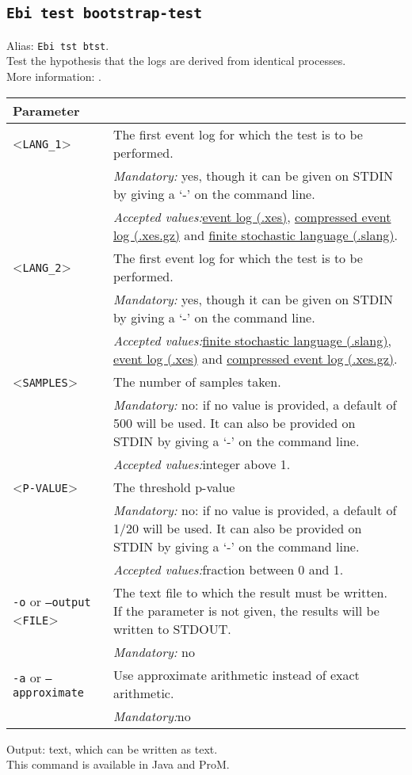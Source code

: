 {\subsection{\texttt{Ebi test bootstrap-test}}
\label{command:Ebi test bootstrap-test}
Alias: \texttt{Ebi tst btst}.\\
Test the hypothesis that the logs are derived from identical processes.\\
More information: \cite{DBLP:journals/tkde/LeemansMPH23}.\\
\begin{tabularx}{\linewidth}{lX}
\toprule
Parameter \\\midrule
<\texttt{LANG\_1}>&The first event log for which the test is to be performed.\\
&\textit{Mandatory:} \quad yes, though it can be given on STDIN by giving a `-' on the command line.\\
&\textit{Accepted values:}\quad \hyperref[filehandler:event log]{event log (.xes)}, \hyperref[filehandler:compressed event log]{compressed event log (.xes.gz)} and \hyperref[filehandler:finite stochastic language]{finite stochastic language (.slang)}.\\
<\texttt{LANG\_2}>&The first event log for which the test is to be performed.\\
&\textit{Mandatory:} \quad yes, though it can be given on STDIN by giving a `-' on the command line.\\
&\textit{Accepted values:}\quad \hyperref[filehandler:finite stochastic language]{finite stochastic language (.slang)}, \hyperref[filehandler:event log]{event log (.xes)} and \hyperref[filehandler:compressed event log]{compressed event log (.xes.gz)}.\\
<\texttt{SAMPLES}>&The number of samples taken.\\
&\textit{Mandatory:} \quad no: if no value is provided, a default of 500 will be used. It can also be provided on STDIN by giving a `-' on the command line.\\
&\textit{Accepted values:}\quad integer above 1.\\
<\texttt{P-VALUE}>&The threshold p-value\\
&\textit{Mandatory:} \quad no: if no value is provided, a default of 1/20 will be used. It can also be provided on STDIN by giving a `-' on the command line.\\
&\textit{Accepted values:}\quad fraction between 0 and 1.\\
\texttt{-o} or \texttt{--output} <\texttt{FILE}> &
The text file to which the result must be written. If the parameter is not given, the results will be written to STDOUT.\\
&\textit{Mandatory:} \quad no\\
\texttt{-a} or \texttt{--approximate} & Use approximate arithmetic instead of exact arithmetic.\\
&\textit{Mandatory:}\quad no\\
\bottomrule
\end{tabularx}
\noindent Output: text, which can be written as  text.
\\This command is available in Java and ProM.
}
